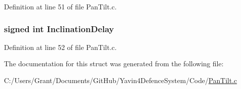 Definition at line 51 of file Pan\+Tilt.\+c.

\hypertarget{struct_delay_a4f5b10a6a07a4aaed02134ab2691b8ec}{
\subsubsection[{Inclination\+Delay}]{\setlength{\rightskip}{0pt plus 5cm}signed int Inclination\+Delay}}\label{struct_delay_a4f5b10a6a07a4aaed02134ab2691b8ec}


Definition at line 52 of file Pan\+Tilt.\+c.



The documentation for this struct was generated from the following file\+:\begin{DoxyCompactItemize}
\item 
C\+:/\+Users/\+Grant/\+Documents/\+Git\+Hub/\+Yavin4\+Defence\+System/\+Code/\hyperlink{_pan_tilt_8c}{Pan\+Tilt.\+c}\end{DoxyCompactItemize}
